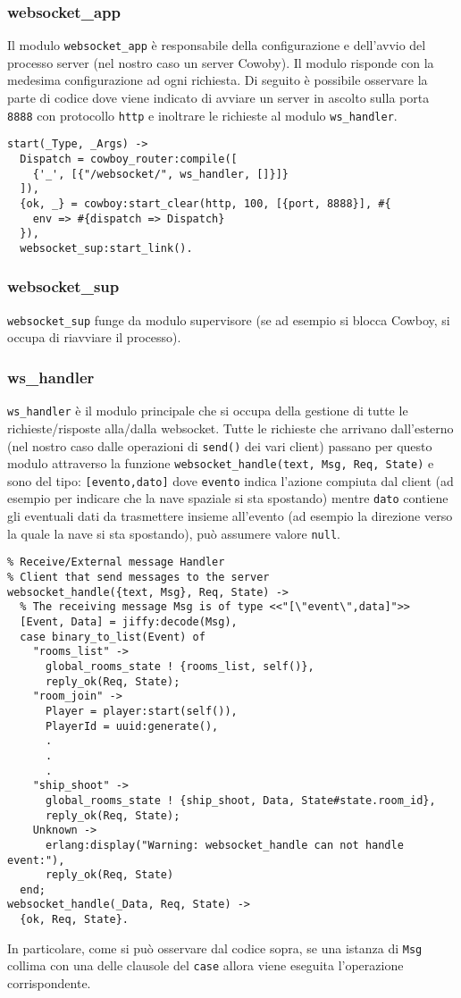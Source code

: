 \documentclass[paper=a4, fontsize=11pt]{scrartcl} %
\numberwithin{equation}{section} %
\numberwithin{figure}{section} %
\numberwithin{table}{section} %
\begin{document}
\subsubsection{websocket\_app}
Il modulo \texttt{websocket\_app} è responsabile della configurazione e dell'avvio del processo server (nel nostro caso un server Cowoby). Il modulo risponde con la medesima configurazione ad ogni richiesta.
Di seguito è possibile osservare la parte di codice dove viene indicato di avviare un server in ascolto sulla porta \texttt{8888} con protocollo \texttt{http} e inoltrare le richieste al modulo \texttt{ws\_handler}.
\begin{lstlisting}
start(_Type, _Args) ->
  Dispatch = cowboy_router:compile([
    {'_', [{"/websocket/", ws_handler, []}]}
  ]),
  {ok, _} = cowboy:start_clear(http, 100, [{port, 8888}], #{
    env => #{dispatch => Dispatch}
  }),
  websocket_sup:start_link().
\end{lstlisting}
\subsubsection{websocket\_sup}
\texttt{websocket\_sup} funge da modulo supervisore (se ad esempio si blocca Cowboy, si occupa di riavviare il processo).
\subsubsection{ws\_handler}
\texttt{ws\_handler} è il modulo principale che si occupa della gestione di tutte le richieste/risposte alla/dalla websocket. Tutte le richieste che arrivano dall'esterno (nel nostro caso dalle operazioni di \texttt{send()} dei vari client) passano per questo modulo attraverso la funzione \texttt{websocket\_handle({text, Msg}, Req, State)} e sono del tipo: \texttt{[evento,dato]} dove \texttt{evento} indica l'azione compiuta dal client (ad esempio per indicare che la nave spaziale si sta spostando) mentre \texttt{dato} contiene gli eventuali dati da trasmettere insieme all'evento (ad esempio la direzione verso la quale la nave si sta spostando), può assumere valore \texttt{null}.
\begin{lstlisting}
% Receive/External message Handler
% Client that send messages to the server
websocket_handle({text, Msg}, Req, State) ->
  % The receiving message Msg is of type <<"[\"event\",data]">>
  [Event, Data] = jiffy:decode(Msg),
  case binary_to_list(Event) of
    "rooms_list" ->
      global_rooms_state ! {rooms_list, self()},
      reply_ok(Req, State);
    "room_join" ->
      Player = player:start(self()),
      PlayerId = uuid:generate(),
	  .
	  .
	  .
    "ship_shoot" ->
      global_rooms_state ! {ship_shoot, Data, State#state.room_id},
      reply_ok(Req, State);
    Unknown ->
      erlang:display("Warning: websocket_handle can not handle event:"),
      reply_ok(Req, State)
  end;
websocket_handle(_Data, Req, State) ->
  {ok, Req, State}.
\end{lstlisting}
In particolare, come si può osservare dal codice sopra, se una istanza di \texttt{Msg} collima con una delle clausole del \texttt{case} allora viene eseguita l'operazione corrispondente.
\end{document}
